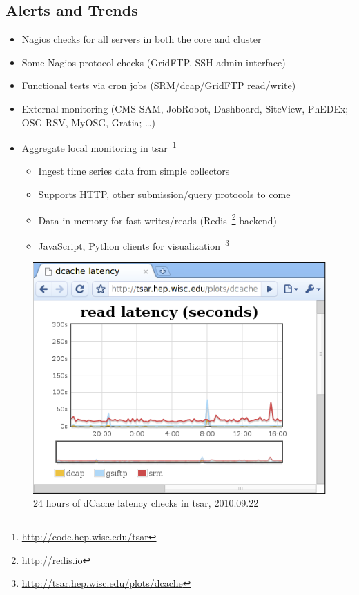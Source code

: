 \documentclass{beamer}
\begin{document}
\subsection{Alerts and Trends} %
\begin{frame}
\begin{itemize}
	\item Nagios checks for all servers in both the core and cluster
	\item Some Nagios protocol checks (GridFTP, SSH admin interface)
	\item Functional tests via cron jobs (SRM/dcap/GridFTP read/write)
	\item External monitoring (CMS SAM, JobRobot, Dashboard, SiteView, PhEDEx; OSG RSV, MyOSG, Gratia; \ldots{})
	\item Aggregate local monitoring in tsar~\footnote{\url{http://code.hep.wisc.edu/tsar}}
	\begin{itemize}
		\item Ingest time series data from simple collectors
		\item Supports HTTP, other submission/query protocols to come
		\item Data in memory for fast writes/reads (Redis~\footnote{\url{http://redis.io}} backend)
		\item JavaScript, Python clients for visualization~\footnote{\url{http://tsar.hep.wisc.edu/plots/dcache}}
	\end{itemize}
\end{itemize}
\end{frame}

\begin{frame}
\begin{figure}
	\includegraphics[width=.6\textwidth]{Graphics/tsar.png}
	\caption{24 hours of dCache latency checks in tsar, 2010.09.22}
\end{figure}
\end{frame}
\end{document}
